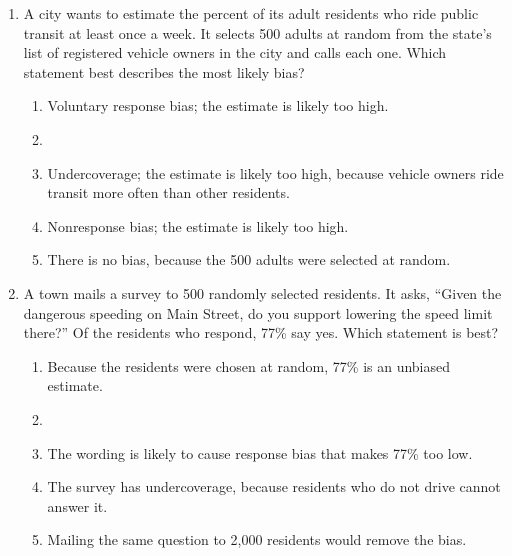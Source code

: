 \documentclass[12pt]{article}
\begin{document}
\begin{enumerate}[leftmargin=1.9em, itemsep=0.10in]

  \item A city wants to estimate the percent of its adult residents who ride public transit at
        least once a week. It selects 500 adults at random from the state's list of registered
        vehicle owners in the city and calls each one. Which statement best describes the most
        likely bias?
        \begin{enumerate}[label=\textbf{(\Alph*)}, leftmargin=2.2em, itemsep=1pt]
          \item Voluntary response bias; the estimate is likely too high.
          \item {}
          \item Undercoverage; the estimate is likely too high, because vehicle owners ride
                transit more often than other residents.
          \item Nonresponse bias; the estimate is likely too high.
          \item There is no bias, because the 500 adults were selected at random.
                \hfill{}\rule[-0.2in]{0pt}{0.48in}
        \end{enumerate}

  \item A town mails a survey to 500 randomly selected residents. It asks, ``Given the
        dangerous speeding on Main Street, do you support lowering the speed limit there?''
        Of the residents who respond, 77\% say yes. Which statement is best?
        \begin{enumerate}[label=\textbf{(\Alph*)}, leftmargin=2.2em, itemsep=1pt]
          \item Because the residents were chosen at random, 77\% is an unbiased estimate.
          \item {}
          \item The wording is likely to cause response bias that makes 77\% too low.
          \item The survey has undercoverage, because residents who do not drive cannot
                answer it.
          \item Mailing the same question to 2{,}000 residents would remove the bias.
                \hfill{}\rule[-0.2in]{0pt}{0.48in}
        \end{enumerate}

\end{enumerate}
\end{document}
